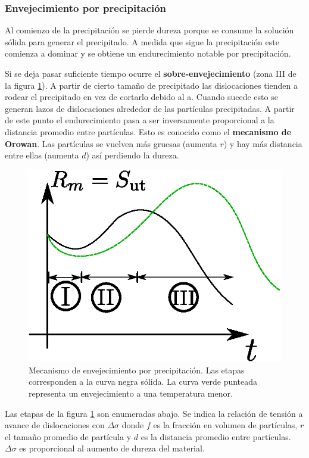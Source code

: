 \subsubsection{Envejecimiento por precipitación}
Al comienzo de la precipitación se pierde dureza porque se consume la solución sólida para generar el precipitado. A medida que sigue la precipitación este comienza a dominar y se obtiene un endurecimiento notable por precipitación. 

Si se deja pasar suficiente tiempo ocurre el \textbf{sobre-envejecimiento} (zona III de la figura \ref{fig:orowan}). A partir de cierto tamaño de precipitado las dislocaciones tienden a rodear el precipitado en vez de cortarlo debido al a. Cuando sucede esto se generan lazos de dislocaciones alrededor de las partículas precipitadas. A partir de este punto el endurecimiento pasa a ser inversamente proporcional a la distancia promedio entre partículas. Esto es conocido como el \textbf{mecanismo de Orowan}.
  Las partículas se vuelven más gruesas (aumenta $r$) y hay más distancia entre ellas (aumenta $d$) así perdiendo la dureza.
 

\begin{figure}[htb]
	\centering
	\includegraphics[width=0.5\linewidth]{fig/orowan.eps}
	\caption{Mecanismo de envejecimiento por precipitación. Las etapas corresponden a la curva negra sólida. La curva verde punteada representa un envejecimiento a una temperatura menor.}
	\label{fig:orowan}
\end{figure}

Las etapas de la figura \ref{fig:orowan} son enumeradas abajo. Se indica la relación de tensión a avance de dislocaciones con $\Delta \sigma$ donde $f$ es la fracción en volumen de partículas, $r$ el tamaño promedio de partícula y $d$ es la distancia promedio entre partículas. $\Delta \sigma$ es proporcional al aumento de dureza del material.

